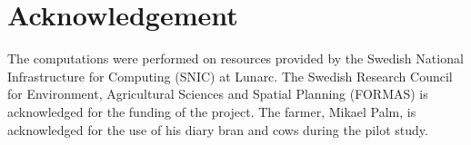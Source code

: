 \documentclass{cta-author}
\begin{document}
\section{Acknowledgement}
The computations were performed on resources provided by the Swedish National Infrastructure for Computing
(SNIC) at Lunarc. The Swedish Research Council for Environment, Agricultural Sciences and
Spatial Planning (FORMAS) is acknowledged
for the funding of the project. The farmer, Mikael Palm, is acknowledged for the use of his diary bran and
cows during the pilot study.




{\parindent0pt
\parskip8pt

}
\end{document}

